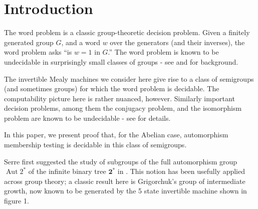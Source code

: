 \documentclass[11pt, titlepage]{article}
\begin{document}
\pagestyle{plain}
\title{\rmfamily\normalfont{}} \author{} \date{May 5, 2017}

\maketitle

\begin{abstract}
  We consider a variety of decision problems in groups and semigroups
  induced by invertible Mealy machines. Notably, we present proof
  that, in the Abelian case, the automorphism membership problem is
  decidable in these semigroups. In addition, we prove the
  undecidability of a Knapsack variant. Partial work toward the
  decidability of the IsGroup problem is discussed.
\end{abstract}

\tableofcontents

\section{Introduction}
The word problem is a classic group-theoretic decision problem. Given
a finitely generated group $G$, and a word $w$ over the generators
(and their inverses), the word problem asks ``is $w = 1$ in $G$.'' The word
problem is known to be undecidable in surprisingly small classes of
groups - see \cite{Cain09:auto_sg} and \cite{Cain09:dec_prob} for background.

The invertible Mealy machines we consider here give rise to a class of
semigroups (and sometimes groups) for which the word problem is
decidable. The computability picture here is rather nuanced,
however. Similarly important decision problems, among them the
conjugacy problem, and the isomorphism problem are known to be
undecidable - see \cite{sunic:conj} for details.

In this paper, we present proof that, for the Abelian case,
automorphism membership testing is decidable in this class of
semigroups.

Serre first suggested the study of subgroups of the full automorphism
group $\operatorname{Aut}2^*$ of the infinite binary tree
$\textbf{2}^*$ in \cite{Serre:old}.  This notion has been usefully
applied across group theory; a classic result here is Grigorchuk's
group of intermediate growth, now known to be generated by the 5 state
invertible machine shown in figure 1.
\end{document}
